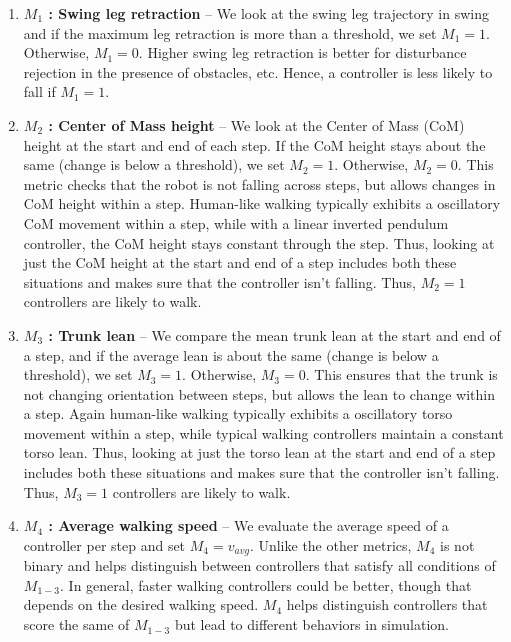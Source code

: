 \begin{enumerate}
    \item {\bf{$M_1$ : Swing leg retraction}} -- We look at the swing leg trajectory in swing and if the maximum leg retraction is more than a threshold, we set $M_1 = 1$. Otherwise, $M_1 = 0$. Higher swing leg retraction is better for disturbance rejection in the presence of obstacles, etc. Hence, a controller is less likely to fall if $M_1 = 1$.
    
    \item {\bf{$M_2$ : Center of Mass height}} -- We look at the Center of Mass (CoM) height at the start and end of each step. If the CoM height stays about the same (change is below a threshold), we set $M_2 = 1$. Otherwise, $M_2 = 0$. This metric checks that the robot is not falling across steps, but allows changes in CoM height within a step. Human-like walking typically exhibits a oscillatory CoM movement within a step, while with a linear inverted pendulum controller, the CoM height stays constant through the step. Thus, looking at just the CoM height at the start and end of a step includes both these situations and makes sure that the controller isn't falling. Thus, $M_2 = 1$ controllers are likely to walk.
    
    \item {\bf{$M_3$ : Trunk lean}} -- We compare the mean trunk lean at the start and end of a step, and if the average lean is about the same (change is below a threshold), we set $M_3 = 1$. Otherwise, $M_3 = 0$. This ensures that the trunk is not changing orientation between steps, but allows the lean to change within a step. Again human-like walking typically exhibits a oscillatory torso movement within a step, while typical walking controllers maintain a constant torso lean. Thus, looking at just the torso lean at the start and end of a step includes both these situations and makes sure that the controller isn't falling. Thus, $M_3 = 1$ controllers are likely to walk.
    
    
    \item {\bf{$M_4$ : Average walking speed}} -- We evaluate the average speed of a controller per step and set $M_4 = v_{avg}$. Unlike the other metrics, $M_4$ is not binary and helps distinguish between controllers that satisfy all conditions of $M_{1-3}$. In general, faster walking controllers could be better, though that depends on the desired walking speed. $M_4$ helps distinguish controllers that score the same of $M_{1-3}$ but lead to different behaviors in simulation.
    
\end{enumerate}

